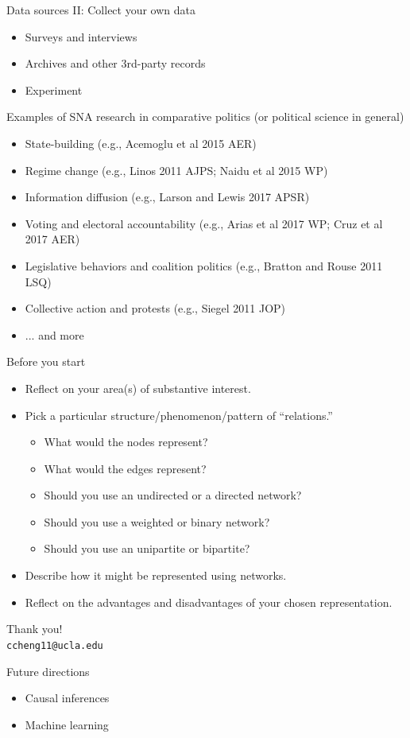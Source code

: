 \documentclass[10pt]{beamer}
\begin{document}
\begin{frame}{Data sources II: Collect your own data}

	\begin{itemize}
		\item Surveys and interviews
		\item Archives and other 3rd-party records
		\item Experiment
	\end{itemize}
\end{frame}

\begin{frame}{Examples of SNA research in comparative politics (or political science in general)}

	\begin{itemize}
	\item State-building (e.g., Acemoglu et al 2015 AER)
	\item Regime change (e.g., Linos 2011 AJPS; Naidu et al 2015 WP)
	\item Information diffusion (e.g., Larson and Lewis 2017 APSR)
	\item Voting and electoral accountability (e.g., Arias et al 2017 WP; Cruz et al 2017 AER)
	\item Legislative behaviors and coalition politics (e.g., Bratton and Rouse 2011 LSQ)
	\item Collective action and protests (e.g., Siegel 2011 JOP)
	\item ... and more
	\end{itemize}
\end{frame}

\begin{frame}{Before you start}
	\begin{itemize}
		\item Reflect on your area(s) of substantive interest.
		\item Pick a particular structure/phenomenon/pattern of ``relations.''
			\begin{itemize}
			\item What would the nodes represent?
			\item What would the edges represent?
			\item Should you use an undirected or a directed network?
			\item Should you use a weighted or binary network?
			\item Should you use an unipartite or bipartite?
			\end{itemize}
		\item Describe how it might be represented using networks.
		\item Reflect on the advantages and disadvantages of your chosen representation.
	\end{itemize}
\end{frame}

\begin{frame}
Thank you!\\
\vspace{0.3cm}
\texttt{ccheng11@ucla.edu}
\end{frame}

\begin{frame}{Future directions}
	\begin{itemize}
		\item Causal inferences
		\item Machine learning
	\end{itemize}
\end{frame}
\end{document}
